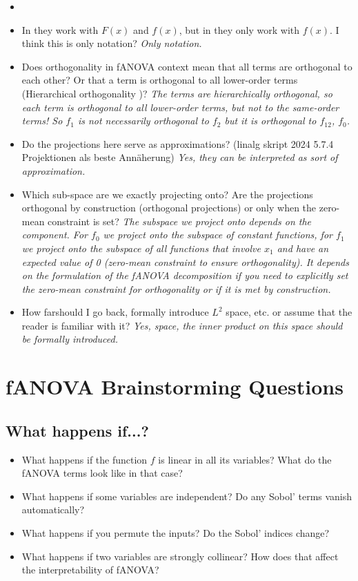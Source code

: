 \begin{itemize}
    \item 
    \item In \cite{hooker2004} they work with $F(x)$ and $f(x)$, but in \cite{sobol2001} they only work with $f(x)$. I think this is only notation? \textit{Only notation.}
    \item Does orthogonality in fANOVA context mean that all terms are orthogonal to each other? Or that a term is orthogonal to all lower-order terms (\ldq Hierarchical orthogonality \rdq)? \textit{The terms are hierarchically orthogonal, so each term is orthogonal to all lower-order terms, but not to the same-order terms! So $f_1$ is not necessarily orthogonal to $f_2$ but it is orthogonal to $f_{12}$, $f_{0}$.} 
    \item Do the projections here serve as approximations? (linalg skript 2024 5.7.4 Projektionen als beste Annäherung) \textit{Yes, they can be interpreted as sort of approximation.}
    \item Which sub-space are we exactly projecting onto? Are the projections orthogonal by construction (orthogonal projections) or only when the zero-mean constraint is set? \textit{The subspace we project onto depends on the component. For $f_0$ we project onto the subspace of constant functions, for $f_1$ we project onto the subspace of all functions that involve $x_1$ and have an expected value of 0 (zero-mean constraint to ensure orthogonality). It depends on the formulation of the fANOVA decomposition if you need to explicitly set the zero-mean constraint for orthogonality or if it is met by construction.}
    \item How \ldq far\rdq should I go back, formally introduce $L^2$ space, etc. or assume that the reader is familiar with it? \textit{Yes, space, the inner product on this space should be formally introduced.}
\end{itemize}

\section*{fANOVA Brainstorming Questions}

\subsection*{What happens if...?}
\begin{itemize}
    \item What happens if the function \( f \) is linear in all its variables? What do the fANOVA terms look like in that case?
    \item What happens if some variables are independent? Do any Sobol’ terms vanish automatically?
    \item What happens if you permute the inputs? Do the Sobol’ indices change?
    \item What happens if two variables are strongly collinear? How does that affect the interpretability of fANOVA?
\end{itemize}

